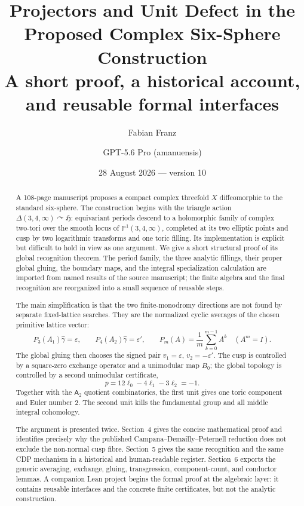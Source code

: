 \documentclass[11pt,reqno]{amsart}
\title[Projectors and unit defect for the proposed complex $S^6$]{Projectors and Unit Defect in the Proposed Complex Six-Sphere Construction\\[4pt]
\large A short proof, a historical account, and reusable formal interfaces}
\author{Fabian Franz}
\author{GPT-5.6 Pro (amanuensis)}
\date{28 August 2026 \;---\; version 10}
\numberwithin{equation}{section}
\newcommand{\Pone}{\mathbb P^1}
\newcommand{\eps}{\varepsilon}
\newcommand{\epsp}{\varepsilon'}
\newcommand{\wideg}{\widehat\gamma}
\newcommand{\Aroot}{\mathsf{A}_2}
\theoremstyle{definition}
\begin{document}
\raggedbottom

\begin{abstract}
A 108-page manuscript proposes a compact complex threefold $X$ diffeomorphic to the standard six-sphere. The construction begins with the triangle action $\Delta(3,4,\infty)\curvearrowright\mathfrak H$: equivariant periods descend to a holomorphic family of complex two-tori over the smooth locus of $\Pone(3,4,\infty)$, completed at its two elliptic points and cusp by two logarithmic transforms and one toric filling. Its implementation is explicit but difficult to hold in view as one argument. We give a short structural proof of its global recognition theorem. The period family, the three analytic fillings, their proper global gluing, the boundary maps, and the integral specialization calculation are imported from named results of the source manuscript; the finite algebra and the final recognition are reorganized into a small sequence of reusable steps.

The main simplification is that the two finite-monodromy directions are not found by separate fixed-lattice searches. They are the normalized cyclic averages of the chosen primitive lattice vector:
\[
 P_3(A_1)\wideg=\eps,
 \qquad
 P_4(A_2)\wideg=\epsp,
 \qquad
 P_m(A)=\frac1m\sum_{k=0}^{m-1}A^k
 \quad(A^m=I).
\]
The global gluing then chooses the signed pair $v_1=\eps$, $v_2=-\epsp$. The cusp is controlled by a square-zero exchange operator and a unimodular map $B_0$; the global topology is controlled by a second unimodular certificate,
\[
 p=12\ell_0-4\ell_1-3\ell_2=-1.
\]
Together with the $\Aroot$ quotient combinatorics, the first unit gives one toric component and Euler number $2$. The second unit kills the fundamental group and all middle integral cohomology.

The argument is presented twice. Section~4 gives the concise mathematical proof and identifies precisely why the published Campana--Demailly--Peternell reduction does not exclude the non-normal cusp fibre. Section~5 gives the same recognition and the same CDP mechanism in a historical and human-readable register. Section~6 exports the generic averaging, exchange, gluing, transgression, component-count, and conductor lemmas. A companion Lean project begins the formal proof at the algebraic layer: it contains reusable interfaces and the concrete finite certificates, but not the analytic construction.
\end{abstract}

\maketitle
\tableofcontents
\end{document}
